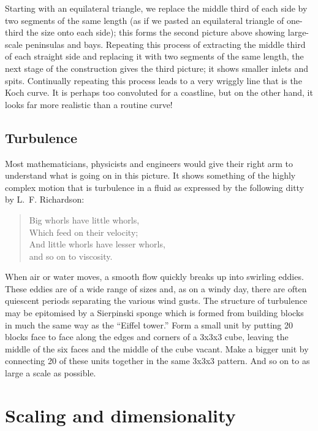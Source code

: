 \documentclass[12pt,a5paper]{article}
\begin{document}
Starting with an equilateral triangle, we replace the middle third of 
each side by two segments of the same length (as if we pasted an 
equilateral triangle of one-third the size onto each side); this 
forms the second picture above showing large-scale peninsulas and 
bays.  Repeating this process of extracting the middle third of each 
straight side and replacing it with two segments of the same length, 
the next stage of the construction gives the third picture; it shows 
smaller inlets and spits.  Continually repeating this process leads 
to a very wriggly line that is the Koch curve.  It is perhaps too 
convoluted for a coastline, but on the other hand, it looks far more 
realistic than a routine curve!

\subsection{Turbulence}

Most mathematicians, physicists and engineers would give their right 
arm to understand what is going on in this picture.  It shows 
something of the highly complex motion that is turbulence in a fluid 
as expressed by the following ditty by L.~F. Richardson:
\begin{verse}
	Big whorls have little whorls,\\
	Which feed on their velocity;\\
	And little whorls have lesser whorls,\\
	and so on to viscosity.
\end{verse}

When air or water moves, a smooth flow quickly breaks up into 
swirling eddies.  These eddies are of a wide range of sizes and, as 
on a windy day, there are often quiescent periods separating the 
various wind gusts.  The structure of turbulence may be epitomised by 
a Sierpinski sponge which is formed from building blocks in much the 
same way as the ``Eiffel tower.''  Form a small unit by putting 20 
blocks face to face along the edges and corners of a 3x3x3 cube, 
leaving the middle of the six faces and the middle of the cube 
vacant.  Make a bigger unit by connecting 20 of these units together 
in the same 3x3x3 pattern.  And so on to as large a scale as possible.

\section{Scaling and dimensionality}
\end{document}
